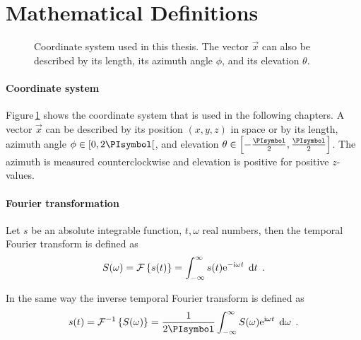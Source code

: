 \section{Mathematical Definitions}
\label{sec:mathematical_definitions}
%
\begin{figure}
    \centering
    \small
    
    \caption{Coordinate system used in this thesis. The vector $\vec{x}$ can also
    be described by its length, its azimuth angle $\phi$, and its elevation
    $\theta$.
    }
    \label{fig:coordinate_system}
\end{figure}
%
\paragraph{Coordinate system}
Figure\,\ref{fig:coordinate_system} shows the coordinate system that is used in
the following chapters. A vector $\vec{x}$ can be described by its position
$(x,y,z)$ in space or by its length, azimuth angle $\phi \in [0,2\PI[$,
and elevation $\theta \in \left[-\frac{\PI}{2},\frac{\PI}{2}\right]$.
The azimuth is measured counterclockwise and elevation is positive
for positive $z$-values.


\paragraph{Fourier transformation}
Let $s$ be an absolute integrable function, $t,\omega$ real numbers, then the
temporal Fourier transform is defined as\autocite{Bracewell2000}
%
\begin{equation}
    S(\omega) = \mathcal{F}\left\{s(t)\right\} = \int^{\infty}_{-\infty} s(t) \mathrm{e}^{-\mathrm{i}\omega t}
    \; \mathop{\mathrm{d}{t}}
    \;.
    \label{eq:ft}
\end{equation}

In the same way the inverse temporal Fourier transform is defined as
%
\begin{equation}
    s(t) = \IFT{S(\omega)} = \frac{1}{2\PI} \int^{\infty}_{-\infty} S(\omega)
    \E^{\I\omega t} \; \D\omega
    \qp
    \label{eq:ift}
\end{equation}
